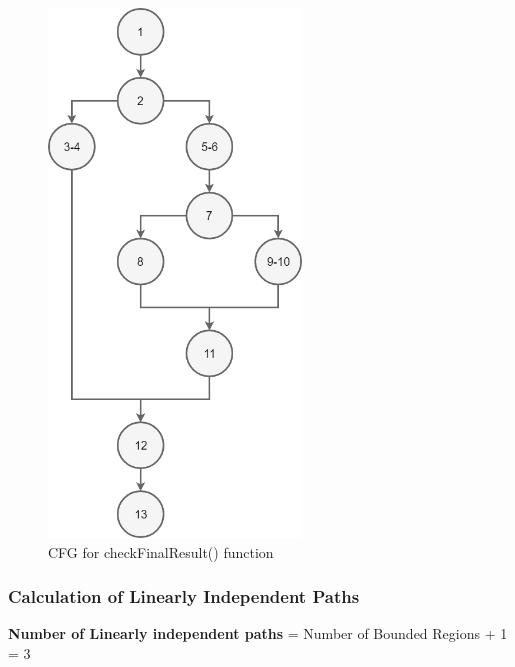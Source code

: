 \documentclass{scrreprt}
\begin{document}
\begin{figure}[H]
\centering
\includegraphics[width=0.6\textwidth, keepaspectratio]{checkFinalResult.png}
\caption{CFG for checkFinalResult() function}
\end{figure}


\newpage


\subsubsection{Calculation of Linearly Independent Paths}
\textbf{Number of Linearly independent paths} = Number of Bounded Regions + 1 = 3
\end{document}
